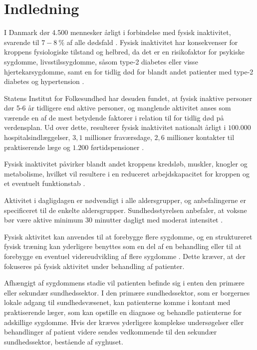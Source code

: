 \chapter{Indledning} \label{sec:indledning}
I Danmark dør 4.500 mennesker årligt i forbindelse med fysisk inaktivitet, svarende til $7-8~\%$ af alle dødsfald \citep{aagaard2014}. Fysisk inaktivitet har konsekvenser for kroppens fysiologiske tilstand og helbred, da det er en risikofaktor for psykiske sygdomme, livsstilssygdomme, såsom type-2 diabetes eller visse hjertekarsygdomme, samt en for tidlig død for blandt andet patienter med type-2 diabetes og hypertension \citep{motionsraad2007}. 

Statens Institut for Folkesundhed har desuden fundet, at fysisk inaktive personer dør 5-6 år tidligere end aktive personer, og manglende aktivitet anses som værende en af de mest betydende faktorer i relation til for tidlig død på verdensplan. Ud over dette, resulterer fysisk inaktivitet nationalt årligt i $100.000$ hospitalsindlæggelser, $3,1$ millioner fraværsdage, $2,6$ millioner kontakter til praktiserende læge og $1.200$ førtidspensioner \citep{christensen2012}.

Fysisk inaktivitet påvirker blandt andet kroppens kredsløb, muskler, knogler og metabolisme, hvilket vil resultere i en reduceret arbejdskapacitet for kroppen og et eventuelt funktionstab \citep{motionsraad2007}.

Aktivitet i dagligdagen er nødvendigt i alle aldersgrupper, og anbefalingerne er specificeret til de enkelte aldersgrupper.
Sundhedsstyrelsen anbefaler, at voksne bør være aktive minimum 30 minutter dagligt med moderat intensitet \citep{pedersen2011}.

Fysisk aktivitet kan anvendes til at forebygge flere sygdomme, og en struktureret fysisk træning kan yderligere benyttes som en del af en behandling eller til at forebygge en eventuel videreudvikling af flere sygdomme \citep{motionsraad2007}. Dette kræver, at der fokuseres på fysisk aktivitet under behandling af patienter.


Afhængigt af sygdommens stadie vil patienten befinde sig i enten den primære eller sekundær sundhedssektor. I den primære sundhedssektor, som er borgernes lokale adgang til sundhedsvæsenet, kan patienterne komme i kontant med praktiserende læger, som kan opstille en diagnose og behandle patienterne for adskillige sygdomme. Hvis der kræves yderligere komplekse undersøgelser eller behandlinger af patient videre sendes vedkommende til den sekundær sundhedssektor, bestående af syghuset. 

